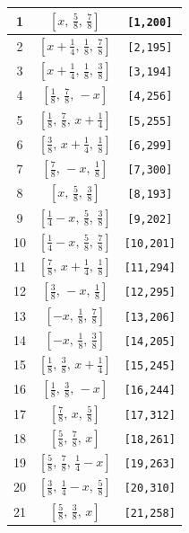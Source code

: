 \documentclass[fleqn,8pt]{jsarticle}
\begin{document}
\begin{longtable}{ccc}
1 & $\left[ x,\, \frac{5}{8},\, \frac{7}{8} \right]$ & {\tt [1,200]} \\ \hline
2 & $\left[ x + \frac{1}{4},\, \frac{1}{8},\, \frac{7}{8} \right]$ & {\tt [2,195]} \\ \hline
3 & $\left[ x + \frac{1}{4},\, \frac{1}{8},\, \frac{3}{8} \right]$ & {\tt [3,194]} \\ \hline
4 & $\left[ \frac{1}{8},\, \frac{7}{8},\, - x \right]$ & {\tt [4,256]} \\ \hline
5 & $\left[ \frac{1}{8},\, \frac{7}{8},\, x + \frac{1}{4} \right]$ & {\tt [5,255]} \\ \hline
6 & $\left[ \frac{3}{8},\, x + \frac{1}{4},\, \frac{1}{8} \right]$ & {\tt [6,299]} \\ \hline
7 & $\left[ \frac{7}{8},\, - x,\, \frac{1}{8} \right]$ & {\tt [7,300]} \\ \hline
8 & $\left[ x,\, \frac{5}{8},\, \frac{3}{8} \right]$ & {\tt [8,193]} \\ \hline
9 & $\left[ \frac{1}{4} - x,\, \frac{5}{8},\, \frac{3}{8} \right]$ & {\tt [9,202]} \\ \hline
10 & $\left[ \frac{1}{4} - x,\, \frac{5}{8},\, \frac{7}{8} \right]$ & {\tt [10,201]} \\ \hline
11 & $\left[ \frac{7}{8},\, x + \frac{1}{4},\, \frac{1}{8} \right]$ & {\tt [11,294]} \\ \hline
12 & $\left[ \frac{3}{8},\, - x,\, \frac{1}{8} \right]$ & {\tt [12,295]} \\ \hline
13 & $\left[ - x,\, \frac{1}{8},\, \frac{7}{8} \right]$ & {\tt [13,206]} \\ \hline
14 & $\left[ - x,\, \frac{1}{8},\, \frac{3}{8} \right]$ & {\tt [14,205]} \\ \hline
15 & $\left[ \frac{1}{8},\, \frac{3}{8},\, x + \frac{1}{4} \right]$ & {\tt [15,245]} \\ \hline
16 & $\left[ \frac{1}{8},\, \frac{3}{8},\, - x \right]$ & {\tt [16,244]} \\ \hline
17 & $\left[ \frac{7}{8},\, x,\, \frac{5}{8} \right]$ & {\tt [17,312]} \\ \hline
18 & $\left[ \frac{5}{8},\, \frac{7}{8},\, x \right]$ & {\tt [18,261]} \\ \hline
19 & $\left[ \frac{5}{8},\, \frac{7}{8},\, \frac{1}{4} - x \right]$ & {\tt [19,263]} \\ \hline
20 & $\left[ \frac{3}{8},\, \frac{1}{4} - x,\, \frac{5}{8} \right]$ & {\tt [20,310]} \\ \hline
21 & $\left[ \frac{5}{8},\, \frac{3}{8},\, x \right]$ & {\tt [21,258]} \\ \hline

\end{longtable}
\end{document}
